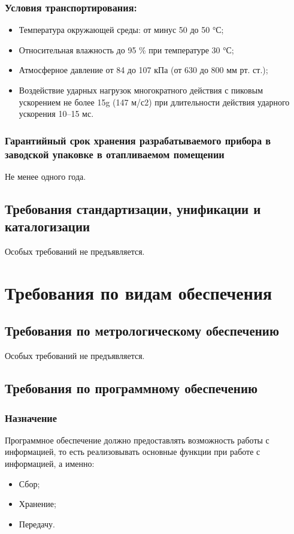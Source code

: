 			\subsubsection{Условия транспортирования:}
				\begin{itemize}
					\item Температура окружающей среды: от минус 50 до 50 °С;
					\item Относительная влажность до 95 \% при температуре 30 °С;
					\item Атмосферное давление от 84 до 107 кПа (от 630 до 800 мм рт. ст.);
					\item Воздействие ударных нагрузок многократного действия с пиковым ускорением не более 15g (147 м/с2) при длительности действия ударного ускорения 10–15 мс.
				\end{itemize}
				\subsubsection{Гарантийный срок хранения разрабатываемого прибора в заводской упаковке в отапливаемом помещении}
					Не менее одного года.
		\subsection{Требования стандартизации, унификации и каталогизации}
			Особых требований не предъявляется.
	\section{Требования по видам обеспечения}
		\subsection{Требования по метрологическому обеспечению}
			Особых требований не предъявляется.
		\subsection{Требования по программному обеспечению}
			\subsubsection{Назначение}
				Программное обеспечение должно предоставлять возможность работы с информацией,
					то есть реализовывать основные функции при работе с информацией, а именно:
				\begin{itemize}
					\item Сбор;
					\item Хранение;
					\item Передачу.
				\end{itemize}
